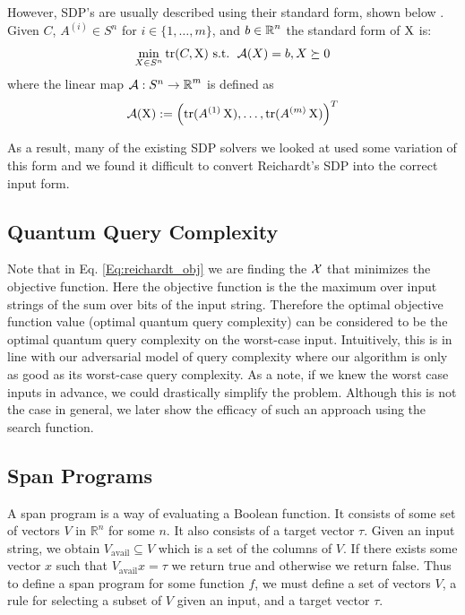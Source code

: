 However, SDP's are usually described using their standard form, shown below \cite{boyd2004convex}. Given $C$, $A^{(i)} \in S^n$ for $i \in \{1,\dots,m\}$, and $b \in \operatorname{\mathbb{R}}^n$
the standard form of $\operatorname{X}$ is:
\begin{align} \label{Eq:standard}
    \min_{X \in S^n} \operatorname{\text{tr}} (C, \operatorname{X}) \textrm{ s.t. }
    \operatorname{\mathcal{A}}(X) = b, X \succeq 0
\end{align}
where the linear map $\operatorname{\mathcal{A}}: S^n \rightarrow \operatorname{\mathbb{R}}^m$ is defined as
\begin{align}
    \operatorname{\mathcal{A}}(\operatorname{X}) := \left( \operatorname{\text{tr}}(A^{(1)} \operatorname{X}), \dots, \operatorname{\text{tr}}(A^{(m)} \operatorname{X}) \right)^T
    \nonumber
\end{align}

As a result, many of the existing SDP solvers we looked at used some variation of this form and we found it difficult to convert Reichardt's SDP into the correct input form.


\subsection{Quantum Query Complexity}

Note that in Eq. \ref{Eq:reichardt_obj} we are finding the 
$\operatorname{\mathcal{X}}$ that minimizes the objective function. Here 
the objective function is the the maximum over input strings 
of the sum over bits of the input string. 
Therefore the optimal objective function value 
(optimal quantum query complexity) can be considered to 
be the optimal quantum query complexity on the worst-case input. 
Intuitively, this is in line with our adversarial model of 
query complexity where our algorithm is only as good 
as its worst-case query complexity. As a note, if we knew the worst case inputs in advance, we could drastically simplify the problem. Although this is not the case in general, we later show the efficacy of such an approach using the search function.

\subsection{Span Programs}
A span program is a way of evaluating a Boolean function. It consists of some set of vectors $V$ in $\mathbb{R}^n$ for some $n$. It also consists of a target vector $\tau$. Given an input string, we obtain $V_{\text{avail}} \subseteq{V}$ which is a set of the columns of $V$. If there exists some vector $x$ such that $V_{\text{avail}} x = \tau$ we return true and otherwise we return false. Thus to define a span program for some function $f$, we must define a set of vectors $V$, a rule for selecting a subset of $V$ given an input, and a target vector $\tau$.


